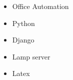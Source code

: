 \begin{screen}


\begin{itemize}
\item Office Automation
\item Python
\item Django
\item Lamp server
\item Latex

\end{itemize}

\end{screen}
\newpage
